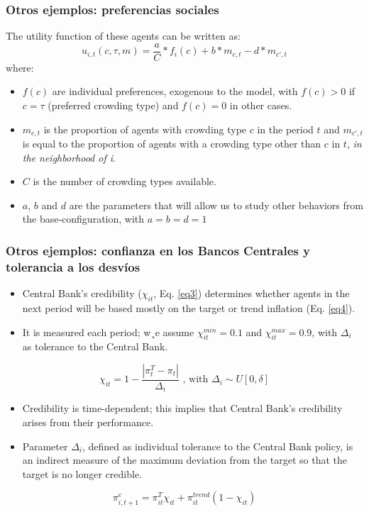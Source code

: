 \documentclass[11pt]{beamer}
\begin{document}
\begin{frame}
\frametitle{Otros ejemplos: preferencias sociales}
The utility function of these agents can be written as: 
\begin{equation}
u_{i,t}(c,\tau, m) = \frac{a}{C}*f_i(c) + b*m_{c,t} - d*m_{c',t}
\end{equation} 
where:
\begin{itemize}
\small	\item $ f(c)$ are individual preferences, exogenous to the model, with $ f(c) > 0 $ if $ c = \tau $ (preferred crowding type) and $ f(c) = 0 $ in other cases.
	\item $m_{c,t}$ is the proportion of agents with crowding type $c$ in the period $ t $ and $m_{c',t}$ is equal to the proportion of agents with a crowding type other than $ c $ in $ t $, \textit{in the neighborhood of i}.
	\item $C$ is the number of crowding types available.
	\item $a$, $b$ and $d$ are the parameters that will allow us to study other behaviors from the base-configuration, with $ a = b = d = 1 $
\end{itemize}
\end{frame}

\begin{frame}
	\frametitle{Otros ejemplos: confianza en los Bancos Centrales y tolerancia a los desvíos}
\begin{itemize}
\small	\item Central Bank's credibility ($\chi_{it}$, Eq. \eqref{eq3}) determines whether agents in the next period will be based mostly on the target or trend inflation (Eq. \eqref{eq4}).
	\item It is measured each period; w¸e assume $\chi^{min}_{it} = 0.1 $ and $\chi^{max}_{it}=0.9$, with $\Delta_{i}$ as tolerance to the Central Bank. 
\end{itemize} 

\begin{equation}
\chi_{it}= 1-\dfrac{|\pi^T_t-\pi_t|}{\Delta_{i}}\text{ , with } \Delta_{i}\sim U[0,\delta]
\label{eq3}
\end{equation}

\begin{itemize}
\small	\item Credibility is time-dependent; this implies that Central Bank's credibility arises from their performance.
	\item  Parameter $\Delta_{i}$, defined as individual tolerance to the Central Bank policy, is an indirect measure of the maximum deviation from the target so that the target is no longer credible.
\end{itemize} 

\begin{equation}
\pi^e_{i,t+1} = \pi^T_{it} \chi_{it} + \pi^{trend}_{it} (1 - \chi_{it})
\label{eq4}
\end{equation}	
\end{frame}
\end{document}
